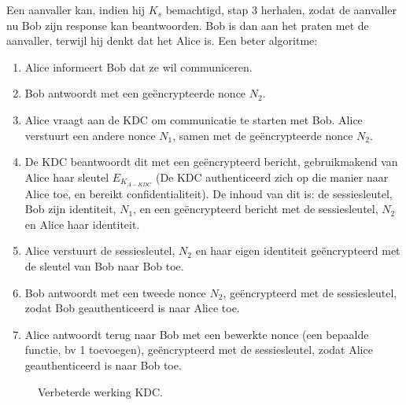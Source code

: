 \documentclass{report}
\begin{document}
	Een aanvaller kan, indien hij $K_s$ bemachtigd, stap 3 herhalen, zodat de aanvaller nu Bob zijn response kan beantwoorden. Bob is dan aan het praten met de aanvaller, terwijl hij denkt dat het Alice is.
	Een beter algoritme:
	\begin{enumerate}
		\item Alice informeert Bob dat ze wil communiceren.
		\item Bob antwoordt met een geëncrypteerde nonce $N_2$.
		\item Alice vraagt aan de KDC om communicatie te starten met Bob. Alice verstuurt een andere nonce $N_1$, samen met de geëncrypteerde nonce $N_2$.
		\item De KDC beantwoordt dit met een geëncrypteerd bericht, gebruikmakend van Alice haar sleutel $E_{K_{A-KDC}}$ (De KDC authenticeerd zich op die manier naar Alice toe, en bereikt confidentialiteit). De inhoud van dit is: de sessiesleutel, Bob zijn identiteit, $N_1$, en een geëncrypteerd bericht met de sessiesleutel, $N_2$ en Alice haar identiteit.
		\item Alice verstuurt de sessiesleutel, $N_2$ en haar eigen identiteit geëncrypteerd met de sleutel van Bob naar Bob toe.
		\item Bob antwoordt met een tweede nonce $N_2$, geëncrypteerd met de sessiesleutel, zodat Bob geauthenticeerd is naar Alice toe.
		\item Alice antwoordt terug naar Bob met een bewerkte nonce (een bepaalde functie, bv 1 toevoegen), geëncrypteerd met de sessiesleutel, zodat Alice geauthenticeerd is naar Bob toe.
	\end{enumerate}
	\begin{figure}
		\centering
		\caption{Verbeterde werking KDC.}
		\label{fig:beterewerkingKDC}
	\end{figure}
\end{document}
